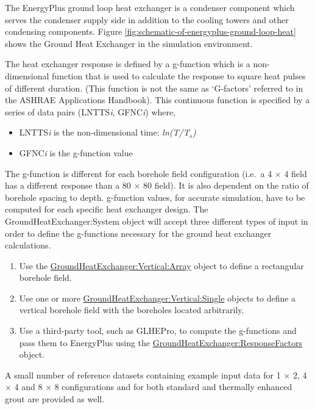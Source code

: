 The EnergyPlus ground loop heat exchanger is a condenser component which serves the condenser supply side in addition to the cooling towers and other condensing components. Figure \ref{fig:schematic-of-energyplus-ground-loop-heat} shows the Ground Heat Exchanger in the simulation environment.

The heat exchanger response is defined by a g-function which is a non-dimensional function that is used to calculate the response to square heat pulses of different duration. (This function is not the same as `G-factors' referred to in the ASHRAE Applications Handbook). This continuous function is specified by a series of data pairs (LNTTS\emph{i}, GFNC\emph{i}) where,

\begin{itemize}
\item
  LNTTS\emph{i} is the non-dimensional time: \emph{ln(T/T\(_{s}\))}
\item
  GFNC\emph{i} is the g-function value
\end{itemize}

The g-function is different for each borehole field configuration (i.e.~a 4 $\times$ 4 field has a different response than a 80 $\times$ 80 field). It is also dependent on the ratio of borehole spacing to depth. g-function values, for accurate simulation, have to be computed for each specific heat exchanger design. The GroundHeatExchanger:System object will accept three different types of input in order to define the g-functions necessary for the ground heat exchanger calculations.

\begin{enumerate}
    \item Use the \hyperref[groundheatexchangerverticalarray]{GroundHeatExchanger:Vertical:Array} object to define a rectangular borehole field.
    \item Use one or more \hyperref[groundheatexchangerverticalsingle]{GroundHeatExchanger:Vertical:Single} objects to define a vertical borehole field with the boreholes located arbitrarily.
    \item Use a third-party tool, such as GLHEPro, to compute the g-functions and pass them to EnergyPlus using the \hyperref[groundheatexchangerresponsefactors]{GroundHeatExchanger:ResponseFactors} object.
\end{enumerate}

A small number of reference datasets containing example input data for 1 $\times$ 2, 4 $\times$ 4 and 8 $\times$ 8 configurations and for both standard and thermally enhanced grout are provided as well.

